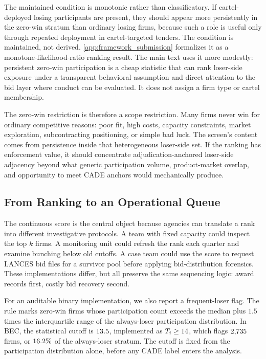 The maintained condition is monotonic rather than classificatory.
If cartel-deployed losing participants are present, they should
appear more persistently in the zero-win stratum than ordinary
losing firms, because such a role is useful only through repeated
deployment in cartel-targeted tenders. The condition is
maintained, not derived. \ref{app:framework_submission}
formalizes it as a monotone-likelihood-ratio ranking result. The
main text uses it more modestly: persistent zero-win participation
is a cheap statistic that can rank loser-side exposure under a
transparent behavioral assumption and direct attention to the bid
layer where conduct can be evaluated. It does not assign a firm
type or cartel membership.

The zero-win restriction is therefore a scope restriction. Many
firms never win for ordinary competitive reasons: poor fit, high costs,
capacity constraints, market exploration, subcontracting
positioning, or simple bad luck. The screen's content comes from
persistence inside that heterogeneous loser-side set. If the
ranking has enforcement value, it should concentrate
adjudication-anchored loser-side adjacency beyond what generic
participation volume, product-market overlap, and opportunity to
meet CADE anchors would mechanically produce.

\subsection{From Ranking to an Operational Queue}
\label{sec:award_rule}

The continuous score is the central object because agencies can
translate a rank into different investigative protocols. A team
with fixed capacity could inspect the top $k$ firms. A
monitoring unit could refresh the rank each quarter and examine
bunching below old cutoffs. A case team could use the score to
request LANCES bid files for a survivor pool before applying
bid-distribution forensics. These implementations differ, but
all preserve the same sequencing logic: award records first,
costly bid recovery second.

For an auditable binary implementation, we also report a
frequent-loser flag. The rule marks zero-win firms whose
participation count exceeds the median plus $1.5$ times the
interquartile range of the always-loser participation
distribution. In BEC, the statistical cutoff is
$13.5$, implemented as $T_i\geq14$, which
flags $2{,}735$ firms, or $16.2\%$ of the always-loser
stratum. The cutoff is fixed from the participation distribution
alone, before any CADE label enters the analysis.

